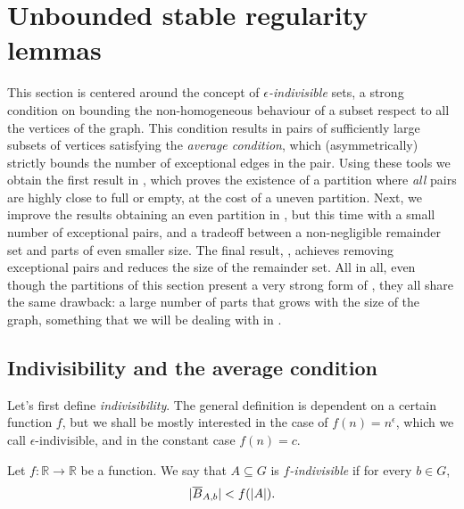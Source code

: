 \section{Unbounded stable regularity lemmas} \label{sec:section_4}

    This section is centered around the concept of \emph{$\epsilon$-indivisible} sets, a strong condition on bounding the
    non-homogeneous behaviour of a subset respect to all the vertices of the graph.
    This condition results in pairs of sufficiently large subsets of vertices satisfying
    the \emph{average condition}, which (asymmetrically) strictly bounds the number of exceptional edges in the pair.
    Using these tools we obtain the first result in ,
    which proves the existence of a partition where \emph{all} pairs are highly close to full or empty, at the cost of a
    uneven partition.
    Next, we improve the results obtaining an even partition in
    , but this time with a
    small number of exceptional pairs, and a tradeoff between a non-negligible remainder set and parts of even smaller size.
    The final result, , achieves removing exceptional pairs
    and reduces the size of the remainder set.
    All in all, even though the partitions of this section present a very strong form of \regularity, they all share
    the same drawback: a large number of parts that grows with the size of the graph, something that we will be dealing
    with in .

    \subsection{Indivisibility and the average condition} \label{subsec:subsection_4.1}

        Let's first define \emph{indivisibility}.
        The general definition is dependent on a certain function $f$, but we shall be mostly
        interested in the case of $f(n) = n^\epsilon$, which we call $\epsilon$-indivisible, and in the constant case $f(n) = c$.

        \begin{definition} \label{def:f_indivisible}
            Let $f: \mathbb{R} \longrightarrow \mathbb{R}$ be a function.
            We say that $A \subseteq G$ is \emph{$f$-indivisible} if for every $b \in G$,
            \[
                | \overline{B}_{A,b} | < f(|A|).
            \]
        \end{definition}

